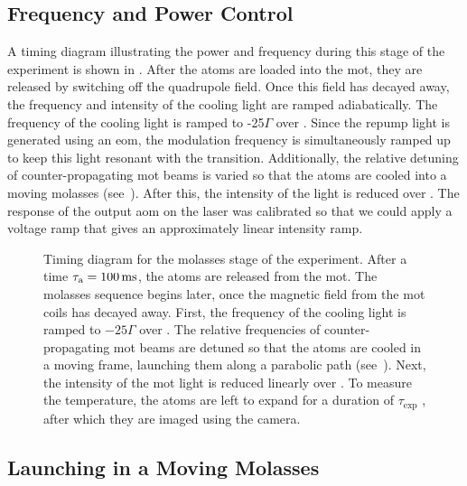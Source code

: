 \subsection{Frequency and Power Control}\label{subsec:molasses_control}
A timing diagram illustrating the power and frequency during this stage of the experiment is shown in . After the atoms are loaded into the \ac{mot}, they are released by switching off the quadrupole field. Once this field has decayed away, the frequency and intensity of the cooling light are ramped adiabatically. The frequency of the cooling light is ramped to -25\(\Gamma\) over . Since the repump light is generated using an \ac{eom}, the modulation frequency is simultaneously ramped up to keep this light resonant with the  transition. Additionally, the relative detuning of counter-propagating \ac{mot} beams is varied so that the atoms are cooled into a moving molasses (see~). After this, the intensity of the light is reduced over . The response of the output \ac{aom} on the \Muquans laser was calibrated so that we could apply a voltage ramp that gives an approximately linear intensity ramp.
\begin{figure}
    \centering
    \resizebox{0.6\textwidth}{!}{}
    \caption[Molasses stage timing diagram]{Timing diagram for the molasses stage of the experiment. After a time \(\tau_\text{a} = \sivalue{100}{\milli\second}\), the atoms are released from the \ac{mot}. The molasses sequence begins  later, once the magnetic field from the \ac{mot} coils has decayed away. First, the frequency of the cooling light is ramped to \(-25 \Gamma\) over . The relative frequencies of counter-propagating \ac{mot} beams are detuned so that the atoms are cooled in a moving frame, launching them along a parabolic path (see~). Next, the intensity of the \ac{mot} light is reduced linearly over . To measure the temperature, the atoms are left to expand for a duration of \(\tau_\text{exp}\) \sivalue{}{\milli\second}, after which they are imaged using the camera.}
    \label{fig:molasses_timing}
\end{figure}
\subsection{Launching in a Moving Molasses}\label{subsec:moving_molasses}

